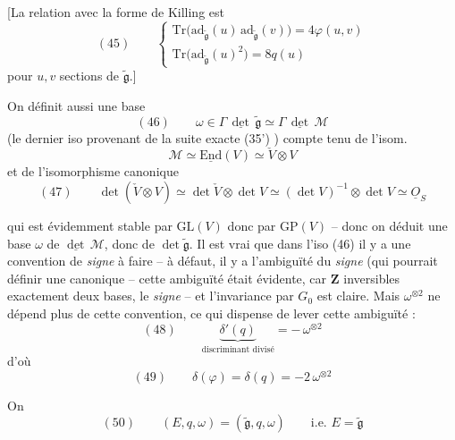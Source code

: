 \documentclass[11pt,a4paper]{article}
\begin{document}
[La relation avec la forme de Killing est
\[
  (45) \qquad \left\lbrace
  \begin{array}{l}
    \mathrm{Tr}\bigl(\mathrm{ad}_{\widetilde{\mathfrak{g}}}(u)\, \mathrm{ad}_{\widetilde{\mathfrak{g}}}(v)\bigr) = 4 \varphi(u, v) \\
    \mathrm{Tr}\bigl(\mathrm{ad}_{\widetilde{\mathfrak{g}}}(u)^2\bigr) = 8 q(u)
  \end{array}\right.
\]
pour $u, v$ sections de $\widetilde{\mathfrak{g}}$.]

On définit aussi une base
\[
  (46) \qquad \omega \in \Gamma\, \underline{\det}\, \widetilde{\mathfrak{g}} \simeq \Gamma\, \underline{\det}\, \mathcal{M}
\]
(le dernier iso provenant de la suite exacte (35') \ill{} \ill{}) compte tenu de
l'isom.\ 
\[
  \mathcal{M} \simeq \underline{\mathrm{End}}(V) \simeq \check{V} \otimes V
\]
et de l'isomorphisme canonique
\[
  (47) \qquad \det(\check{V} \otimes V) \simeq \det \check{V} \otimes \det V
  \simeq (\det V)^{-1} \otimes \det V \simeq \underline{O}_S
\]

qui est évidemment stable par $\mathrm{GL}(V)$ donc par $\mathrm{GP}(V)$ -- donc on
déduit une base $\omega$ de $\underline{\det}\, \mathcal{M}$, donc de
$\det \widetilde{\mathfrak{g}}$. Il est vrai que dans l'iso (46) il y a une
convention de \emph{signe} à faire -- à défaut, il y a l'ambiguïté du \emph{signe}
(qui pourrait définir une \struck{\ill{}} \ill{} canonique \ill{} \ill{} -- cette
ambiguïté était évidente, car  $\mathbf{Z}$ \ill{} inversibles
\ill{} exactement deux bases,   le \emph{signe} --
et l'invariance par  $G_0$ est claire.
Mais $\omega^{\otimes 2}$ ne dépend plus de cette convention, ce qui dispense de
lever cette ambiguïté :
\[
  (48) \qquad \underbrace{\delta'(q)}_{\text{discriminant divisé}} = -\,\omega^{\otimes 2}
\]
d'où
\[
  (49) \qquad \delta(\varphi) = \delta(q) = -2\,\omega^{\otimes 2}
\]

On 
\[
  (50) \qquad (E, q, \omega) = (\widetilde{\mathfrak{g}}, q, \omega) \qquad \text{i.e. } E = \widetilde{\mathfrak{g}}
\]
\end{document}
